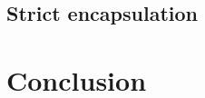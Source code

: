 \documentclass[aspectratio=169]{beamer}
\begin{document}
\subsection{Strict encapsulation}

\section{Conclusion}
\end{document}
